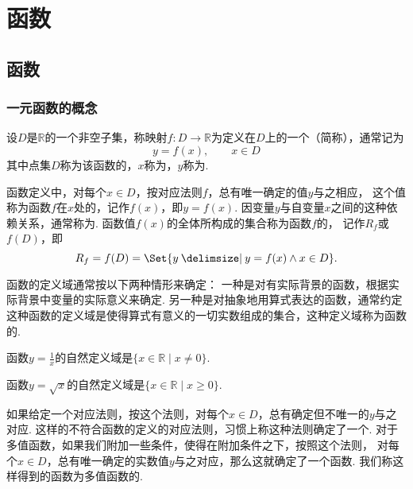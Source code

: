 \chapter{函数}
\section{函数}
\subsection{一元函数的概念}
\begin{definition}
设\(D\)是\(\mathbb{R}\)的一个非空子集，称映射\(f\colon D \to \mathbb{R}\)为定义在\(D\)上的一个（简称），通常记为\[
y = f(x), \qquad x \in D
\]其中点集\(D\)称为该函数的，\(x\)称为，\(y\)称为.

函数定义中，对每个\(x \in D\)，按对应法则\(f\)，总有唯一确定的值\(y\)与之相应，%
这个值称为函数\(f\)在\(x\)处的，记作\(f(x)\)，即\(y=f(x)\).
因变量\(y\)与自变量\(x\)之间的这种依赖关系，通常称为.
函数值\(f(x)\)的全体所构成的集合称为函数\(f\)的，%
记作\(R_f\)或\(f(D)\)，即\[
R_f = f(D) = \Set{ y \given y = f(x) \land x \in D }.
\]

函数的定义域通常按以下两种情形来确定：
一种是对有实际背景的函数，根据实际背景中变量的实际意义来确定.
另一种是对抽象地用算式表达的函数，通常约定这种函数的定义域是使得算式有意义的一切实数组成的集合，这种定义域称为函数的.
\end{definition}

\begin{example}
函数\(y = \frac{1}{x}\)的自然定义域是\(\{ x \in \mathbb{R} \mid x \neq 0 \}\).
\end{example}

\begin{example}
函数\(y = \sqrt{x}\)的自然定义域是\(\{ x \in \mathbb{R} \mid x \geqslant 0 \}\).
\end{example}

\begin{definition}
如果给定一个对应法则，按这个法则，对每个\(x \in D\)，总有确定但不唯一的\(y\)与之对应.
这样的不符合函数的定义的对应法则，习惯上称这种法则确定了一个.
对于多值函数，如果我们附加一些条件，使得在附加条件之下，按照这个法则，%
对每个\(x \in D\)，总有唯一确定的实数值\(y\)与之对应，那么这就确定了一个函数.
我们称这样得到的函数为多值函数的.
\end{definition}

